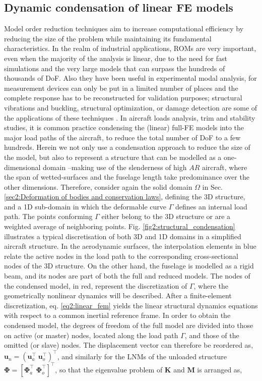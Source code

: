 \documentclass[11pt]{article}
\begin{document}
\subsection{Dynamic condensation of linear FE models}\label{sec:dynamic_condensation}
Model order reduction techniques aim to increase computational efficiency by reducing the size of the problem while maintaining its fundamental characteristics. In the realm of industrial applications, ROMs are very important, even when the majority of the analysis is linear, due to the need for fast simulations and the very large models that can surpass the hundreds of thousands of DoF.  Also they have been useful in experimental modal analysis, for measurement devices can only be put in a limited number of places and the complete response has to be reconstructed for validation purposes; structural vibrations and buckling, structural optimization, or damage detection are some of the applications of these techniques \cite{Qu2010}. In aircraft loads analysis, trim and stability studies, it is common practice condensing the (linear) full-FE models into the major load paths of the aircraft, to reduce the total number of DoF to a few hundreds. Herein we not only use a condensation approach to reduce the size of the model, but also to represent a structure that can be modelled as a one-dimensional domain --making use of the slenderness of high $AR$ aircraft, where the span of wetted-surfaces and the fuselage length take predominance over the other dimensions. Therefore, consider again the solid domain $\Omega$ in Sec. \ref{sec2:Deformation of bodies and conservation laws}, defining the 3D structure, and a 1D sub-domain in which the deformable curve $\Gamma$ defines an internal load path. The points conforming $\Gamma$ either belong to the 3D structure or are a weighted average of neighboring points.  Fig. \ref{fig2:structural_condensation} illustrates a typical discretisation of both 3D and 1D domains in a simplified aircraft structure. In the aerodynamic surfaces, the interpolation elements in blue relate the active nodes in the load path to the corresponding cross-sectional nodes of the 3D structure. On the other hand, the fuselage is modelled as a rigid beam, and its nodes are part of both the full and reduced models. The nodes of the condensed model, in red, represent the discretization of $\Gamma$, where the geometrically nonlinear dynamics will be described.
%
After a finite-element discretization, eq. \eqref{eq2:linear_fem} yields the linear structural dynamics equations with respect to a common inertial reference frame.  In order to obtain the condensed model, the degrees of freedom of the full model are divided into those on active (or master) nodes, located along the load path $\Gamma$, and those of the omitted (or slave) nodes. The displacement vector can therefore be reordered as, $ \pmb{u}_n= \left(\pmb{u}_a^\top \;\pmb{u}_o^\top\right)^\top$, and similarly for the LNMs of the unloaded structure $\pmb{\Phi}=[\pmb{\Phi}_a^\top \; \pmb{\Phi}_o^\top]^\top$, so that the eigenvalue problem of $\bm{K}$ and $\bm{M}$ is arranged as,
\end{document}
